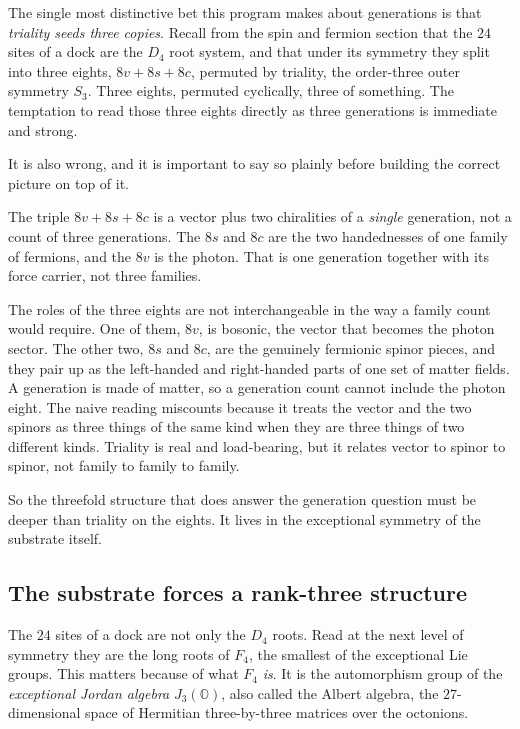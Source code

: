 The single most distinctive bet this program makes about generations is that \emph{triality seeds three copies}. Recall from the spin and fermion section that the $24$ sites of a dock are the $D_4$ root system, and that under its symmetry they split into three eights, $8v + 8s + 8c$, permuted by triality, the order-three outer symmetry $S_3$. Three eights, permuted cyclically, three of something. The temptation to read those three eights directly as three generations is immediate and strong.

It is also wrong, and it is important to say so plainly before building the correct picture on top of it.

\begin{principle}
The triple $8v + 8s + 8c$ is a vector plus two chiralities of a \emph{single} generation, not a count of three generations. The $8s$ and $8c$ are the two handednesses of one family of fermions, and the $8v$ is the photon. That is one generation together with its force carrier, not three families.
\end{principle}

The roles of the three eights are not interchangeable in the way a family count would require. One of them, $8v$, is bosonic, the vector that becomes the photon sector. The other two, $8s$ and $8c$, are the genuinely fermionic spinor pieces, and they pair up as the left-handed and right-handed parts of one set of matter fields. A generation is made of matter, so a generation count cannot include the photon eight. The naive reading miscounts because it treats the vector and the two spinors as three things of the same kind when they are three things of two different kinds. Triality is real and load-bearing, but it relates vector to spinor to spinor, not family to family to family.

So the threefold structure that does answer the generation question must be deeper than triality on the eights. It lives in the exceptional symmetry of the substrate itself.

\subsection{The substrate forces a rank-three structure}

The $24$ sites of a dock are not only the $D_4$ roots. Read at the next level of symmetry they are the long roots of $F_4$, the smallest of the exceptional Lie groups. This matters because of what $F_4$ \emph{is}. It is the automorphism group of the \emph{exceptional Jordan algebra} $J_3(\mathbb{O})$, also called the Albert algebra, the $27$-dimensional space of Hermitian three-by-three matrices over the octonions.

